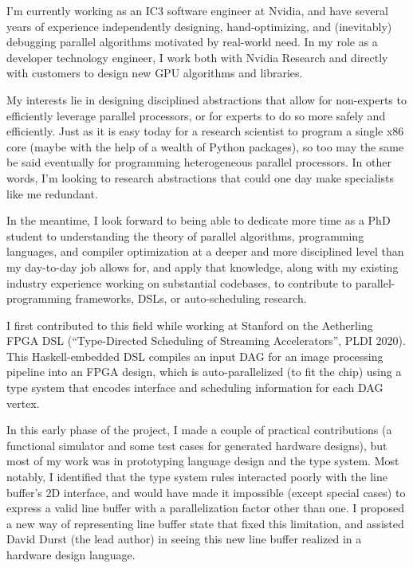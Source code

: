 


\raggedright
\reversemarginpar

I'm currently working as an IC3 software engineer at Nvidia, and have
several years of experience independently designing, hand-optimizing,
and (inevitably) debugging parallel algorithms motivated by real-world
need. In my role as a developer technology engineer, I work both with
Nvidia Research and directly with customers to design new GPU
algorithms and libraries.

My interests lie in designing disciplined abstractions that allow for
non-experts to efficiently leverage parallel processors, or for
experts to do so more safely and efficiently. Just as it is easy today
for a research scientist to program a single x86 core (maybe with the
help of a wealth of Python packages), so too may the same be said
eventually for programming heterogeneous parallel processors. In other
words, I'm looking to research abstractions that could one day make
specialists like me redundant.

In the meantime, I look forward to being able to dedicate more time as
a PhD student to understanding the theory of parallel algorithms,
programming languages, and compiler optimization at a deeper and more
disciplined level than my day-to-day job allows for, and apply that
knowledge, along with my existing industry experience working on
substantial codebases, to contribute to parallel-programming
frameworks, DSLs, or auto-scheduling research.

I first contributed to this field while working at Stanford on the Aetherling FPGA DSL (``Type-Directed Scheduling of Streaming Accelerators'', PLDI 2020). This Haskell-embedded DSL compiles an input DAG for an image processing pipeline into an FPGA design, which is auto-parallelized (to fit the chip) using a type system that encodes interface and scheduling information for each DAG vertex.

In this early phase of the project, I made a couple of practical contributions (a functional simulator and some test cases for generated hardware designs), but most of my work was in prototyping language design and the type system. Most notably, I identified that the type system rules interacted poorly with the line buffer's 2D interface, and would have made it impossible (except special cases) to express a valid line buffer with a parallelization factor other than one. I proposed a new way of representing line buffer state that fixed this limitation, and assisted David Durst (the lead author) in seeing this new line buffer realized in a hardware design language.

